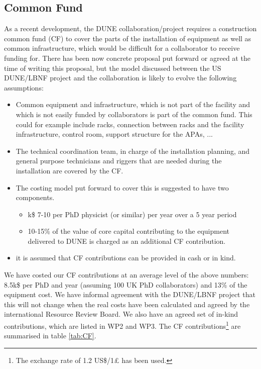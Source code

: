 \subsection{Common Fund}

As a recent development, the DUNE collaboration/project requires a construction common fund (CF) to cover the parts of the installation of equipment as well as common infrastructure, which would be difficult for a collaborator to receive funding for. There has been now concrete proposal put forward or agreed at the time of writing this proposal, but the model discussed between the US DUNE/LBNF project and the collaboration is likely to evolve the following assumptions:
\begin{itemize}
    \item Common equipment and infrastructure, which is not part of the facility and which is not easily funded by collaborators is part of the common fund. This could for example include racks, connection between racks and the facility infrastructure, control room, support structure for the APAs, ...
    \item The technical coordination team, in charge of the installation planning, and general purpose technicians and riggers that are needed during the installation are covered by the CF.
    \item The costing model put forward to cover this is suggested to have two components.
    \begin{itemize}
        \item k\$ 7-10 per PhD physicist (or similar) per year over a 5 year period
        \item 10-15\% of the value of core capital contributing to the equipment delivered to DUNE is charged as an additional CF contribution.
    \end{itemize}
    \item it is assumed that CF contributions can be provided in cash or in kind.
\end{itemize}
We have costed our CF contributions at an average level of the above numbers: 8.5k\$ per PhD and year (assuming 100 UK PhD collaborators) and 13\% of the equipment cost. We have informal agreement with the DUNE/LBNF project that this will not change when the real costs have been calculated and agreed by the international Resource Review Board. We also have an agreed set of in-kind contributions, which are listed in WP2 and WP3. The CF contributions\footnote{The exchange rate of 1.2 US\$/1£ has been used.} are summarised in table \ref{tab:CF}.  

